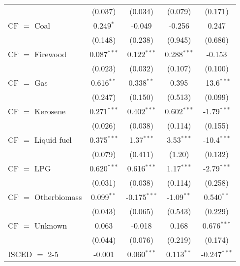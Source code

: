 \begin{table}[htbp!]
\begin{adjustbox}{width = 1\textwidth, max height = 0.95\textheight, center}
\begin{threeparttable}[b]
\begin{tabular}{lcccc}
                                 & (0.037)            & (0.034)            & (0.079)        & (0.171)\\   
            CF $=$ Coal          & 0.249$^{*}$        & -0.049             & -0.256         & 0.247\\   
                                 & (0.148)            & (0.238)            & (0.945)        & (0.686)\\   
            CF $=$ Firewood      & 0.087$^{***}$      & 0.122$^{***}$      & 0.288$^{***}$  & -0.153\\   
                                 & (0.023)            & (0.032)            & (0.107)        & (0.100)\\   
            CF $=$ Gas           & 0.616$^{**}$       & 0.338$^{**}$       & 0.395          & -13.6$^{***}$\\   
                                 & (0.247)            & (0.150)            & (0.513)        & (0.099)\\   
            CF $=$ Kerosene      & 0.271$^{***}$      & 0.402$^{***}$      & 0.602$^{***}$  & -1.79$^{***}$\\   
                                 & (0.026)            & (0.038)            & (0.114)        & (0.155)\\   
            CF $=$ Liquid fuel   & 0.375$^{***}$      & 1.37$^{***}$       & 3.53$^{***}$   & -10.4$^{***}$\\   
                                 & (0.079)            & (0.411)            & (1.20)         & (0.132)\\   
            CF $=$ LPG           & 0.620$^{***}$      & 0.616$^{***}$      & 1.17$^{***}$   & -2.79$^{***}$\\   
                                 & (0.031)            & (0.038)            & (0.114)        & (0.258)\\   
            CF $=$ Otherbiomass  & 0.099$^{**}$       & -0.175$^{***}$     & -1.09$^{**}$   & 0.540$^{**}$\\   
                                 & (0.043)            & (0.065)            & (0.543)        & (0.229)\\   
            CF $=$ Unknown       & 0.063              & -0.018             & 0.168          & 0.676$^{***}$\\   
                                 & (0.044)            & (0.076)            & (0.219)        & (0.174)\\   
            ISCED $=$ 2-5        & -0.001             & 0.060$^{***}$      & 0.113$^{**}$   & -0.247$^{***}$\\   

\end{tabular}
\end{threeparttable}
\end{adjustbox}
\end{table}
